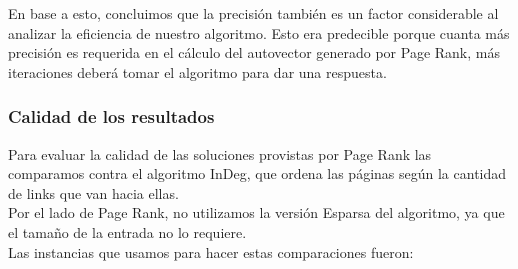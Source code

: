En base a esto, concluimos que la precisión también es un factor considerable al analizar la eficiencia de nuestro algoritmo. Esto era predecible porque cuanta más precisión es requerida en el cálculo del autovector generado por Page Rank, más iteraciones deberá tomar el algoritmo para dar una respuesta.

\subsubsection{Calidad de los resultados}

Para evaluar la calidad de las soluciones provistas por Page Rank las comparamos contra el algoritmo InDeg, que ordena las páginas según la cantidad de links que van hacia ellas.\\
Por el lado de Page Rank, no utilizamos la versión Esparsa del algoritmo, ya que el tamaño de la entrada no lo requiere.\\
Las instancias que usamos para hacer estas comparaciones fueron:

